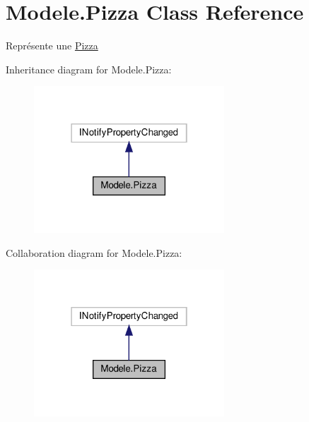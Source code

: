 \hypertarget{classModele_1_1Pizza}{}\section{Modele.\+Pizza Class Reference}
\label{classModele_1_1Pizza}


Représente une \hyperlink{classModele_1_1Pizza}{Pizza}  




Inheritance diagram for Modele.\+Pizza\+:
\nopagebreak
\begin{figure}[H]
\begin{center}
\leavevmode
\includegraphics[width=202pt]{classModele_1_1Pizza__inherit__graph}
\end{center}
\end{figure}


Collaboration diagram for Modele.\+Pizza\+:
\nopagebreak
\begin{figure}[H]
\begin{center}
\leavevmode
\includegraphics[width=202pt]{classModele_1_1Pizza__coll__graph}
\end{center}
\end{figure}
